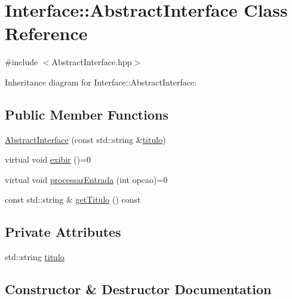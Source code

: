 \hypertarget{class_interface_1_1_abstract_interface}{}\section{Interface\+:\+:Abstract\+Interface Class Reference}
\label{class_interface_1_1_abstract_interface}


{\ttfamily \#include $<$Abstract\+Interface.\+hpp$>$}



Inheritance diagram for Interface\+:\+:Abstract\+Interface\+:
\subsection*{Public Member Functions}
\begin{DoxyCompactItemize}
\item 
\hyperlink{class_interface_1_1_abstract_interface_a3b5c52f2c5ec8adef6646ca2b9afbb08}{Abstract\+Interface} (const std\+::string \&\hyperlink{class_interface_1_1_abstract_interface_af2dfb334225b71ddaca86340ed71aa8a}{titulo})
\item 
virtual void \hyperlink{class_interface_1_1_abstract_interface_af1a45726ea636cdbf1cf2d7daa5708be}{exibir} ()=0
\item 
virtual void \hyperlink{class_interface_1_1_abstract_interface_a9318f98f907ce54ef2dbf892ba327da2}{processar\+Entrada} (int opcao)=0
\item 
const std\+::string \& \hyperlink{class_interface_1_1_abstract_interface_a0c6e8efa0eb89f97157e0e5b28012cb6}{get\+Titulo} () const
\end{DoxyCompactItemize}
\subsection*{Private Attributes}
\begin{DoxyCompactItemize}
\item 
std\+::string \hyperlink{class_interface_1_1_abstract_interface_af2dfb334225b71ddaca86340ed71aa8a}{titulo}
\end{DoxyCompactItemize}


\subsection{Constructor \& Destructor Documentation}
\mbox{\label{class_interface_1_1_abstract_interface_a3b5c52f2c5ec8adef6646ca2b9afbb08}} 
